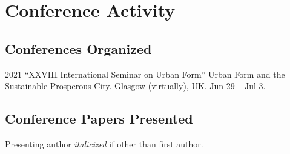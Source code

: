 \documentclass[12pt,a4paper]{report}
\begin{document}
    \section*{Conference Activity}


    \subsection*{Conferences Organized}

    \begin{tablist}

        \item[2021] \tab{}\enquote{XXVIII International Seminar on Urban Form} Urban Form and the Sustainable Prosperous City. Glasgow (virtually), UK. Jun 29 -- Jul 3.

    \end{tablist}

    \subsection*{Conference Papers Presented}

    Presenting author \textit{italicized} if other than first author.\bigskip
\end{document}
